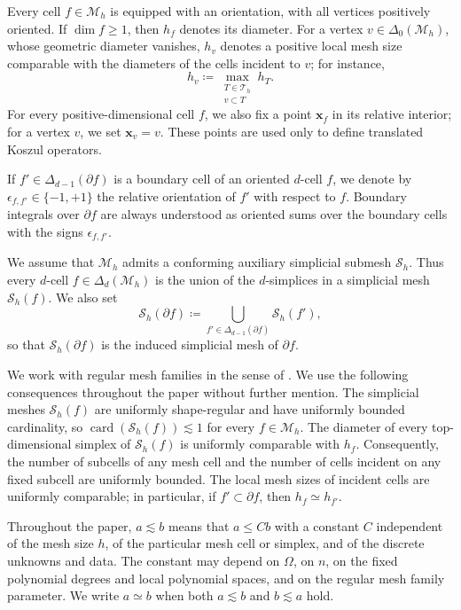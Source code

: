 \documentclass[a4paper,11pt]{article}
\theoremstyle{definition}
\newcommand{\Mh}{\mathcal{M}_h}
\newcommand{\Sh}{\mathcal{S}_h}
\newcommand{\card}{\operatorname{card}}
\newcommand{\FM}[1]{\Delta_{#1}}
\begin{document}
Every cell $f\in\Mh$ is equipped with an orientation, with all vertices positively oriented.
If $\dim f\geq1$, then $h_f$ denotes its diameter.
For a vertex $v\in\FM{0}(\Mh)$, whose geometric diameter vanishes, $h_v$ denotes a positive local mesh size comparable with the diameters of the cells incident to $v$; for instance,
\[
  h_v
  \coloneqq
  \max_{\substack{T\in\mathcal T_h\\v\subset T}}h_T.
\]
For every positive-dimensional cell $f$, we also fix a point $\boldsymbol{x}_f$ in its relative interior; for a vertex $v$, we set $\boldsymbol{x}_v=v$.
These points are used only to define translated Koszul operators.

If $f'\in\FM{d-1}(\partial f)$ is a boundary cell of an oriented $d$-cell $f$, we denote by $\epsilon_{f,f'}\in\{-1,+1\}$ the relative orientation of $f'$ with respect to $f$.
Boundary integrals over $\partial f$ are always understood as oriented sums over the boundary cells with the signs $\epsilon_{f,f'}$.

We assume that $\Mh$ admits a conforming auxiliary simplicial submesh $\Sh$.
Thus every $d$-cell $f\in\FM{d}(\Mh)$ is the union of the $d$-simplices in a simplicial mesh $\Sh(f)$.
We also set
\[
  \Sh(\partial f)
  \coloneqq
  \bigcup_{f'\in\FM{d-1}(\partial f)}\Sh(f'),
\]
so that $\Sh(\partial f)$ is the induced simplicial mesh of $\partial f$.

We work with regular mesh families in the sense of \cite[Definition~1.9]{Di-Pietro.Droniou:20}.
We use the following consequences throughout the paper without further mention.
The simplicial meshes $\Sh(f)$ are uniformly shape-regular and have uniformly bounded cardinality, so $\card(\Sh(f))\lesssim 1$ for every $f\in\Mh$.
The diameter of every top-dimensional simplex of $\Sh(f)$ is uniformly comparable with $h_f$.
Consequently, the number of subcells of any mesh cell and the number of cells incident on any fixed subcell are uniformly bounded.
The local mesh sizes of incident cells are uniformly comparable; in particular, if $f'\subset\partial f$, then $h_f\simeq h_{f'}$.

Throughout the paper, $a\lesssim b$ means that $a\leq Cb$ with a constant $C$ independent of the mesh size $h$, of the particular mesh cell or simplex, and of the discrete unknowns and data.
The constant may depend on $\Omega$, on $n$, on the fixed polynomial degrees and local polynomial spaces, and on the regular mesh family parameter.
We write $a\simeq b$ when both $a\lesssim b$ and $b\lesssim a$ hold.
\end{document}
